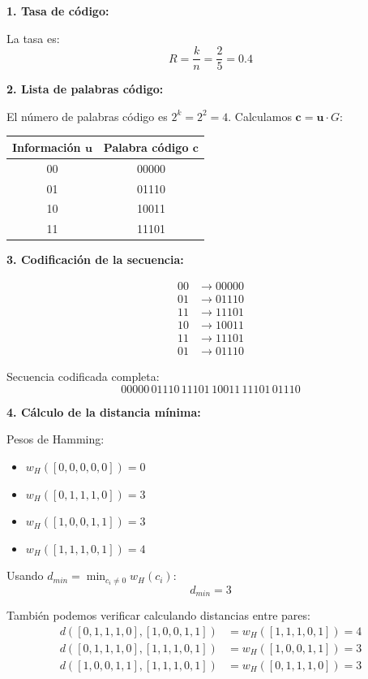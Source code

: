 \documentclass[10pt,a4paper]{article}
\begin{document}
\begin{solucion}
\textbf{1. Tasa de código:}

La tasa es:
\[
R = \frac{k}{n} = \frac{2}{5} = 0.4
\]

\textbf{2. Lista de palabras código:}

El número de palabras código es $2^k = 2^2 = 4$. Calculamos $\mathbf{c} = \mathbf{u} \cdot G$:

\begin{center}
\begin{tabular}{|c|c|}
\hline
Información $\mathbf{u}$ & Palabra código $\mathbf{c}$ \\
\hline
00 & 00000 \\
01 & 01110 \\
10 & 10011 \\
11 & 11101 \\
\hline
\end{tabular}
\end{center}

\textbf{3. Codificación de la secuencia:}

\begin{align*}
00 &\rightarrow 00000 \\
01 &\rightarrow 01110 \\
11 &\rightarrow 11101 \\
10 &\rightarrow 10011 \\
11 &\rightarrow 11101 \\
01 &\rightarrow 01110
\end{align*}

Secuencia codificada completa:
\[
00000 \, 01110 \, 11101 \, 10011 \, 11101 \, 01110
\]

\textbf{4. Cálculo de la distancia mínima:}

Pesos de Hamming:
\begin{itemize}
\item $w_H([0,0,0,0,0]) = 0$
\item $w_H([0,1,1,1,0]) = 3$
\item $w_H([1,0,0,1,1]) = 3$
\item $w_H([1,1,1,0,1]) = 4$
\end{itemize}

Usando $d_{min} = \min_{c_i \neq 0} w_H(c_i)$:
\[
d_{min} = 3
\]

También podemos verificar calculando distancias entre pares:
\begin{align*}
d([0,1,1,1,0], [1,0,0,1,1]) &= w_H([1,1,1,0,1]) = 4 \\
d([0,1,1,1,0], [1,1,1,0,1]) &= w_H([1,0,0,1,1]) = 3 \\
d([1,0,0,1,1], [1,1,1,0,1]) &= w_H([0,1,1,1,0]) = 3
\end{align*}


\end{solucion}
\end{document}
